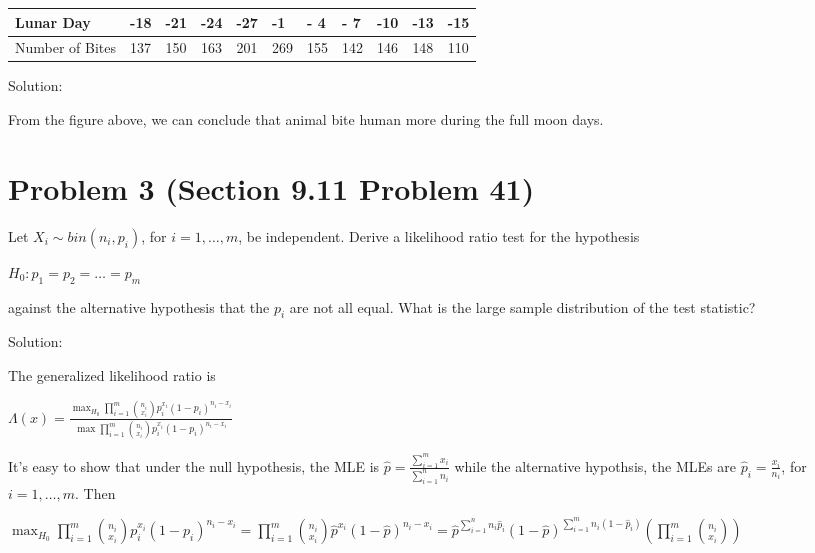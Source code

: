 \documentclass[letterpaper,10pt,english]{sphinxmanual}
\begin{document}
\noindent\begin{tabulary}{\linewidth}{|L|L|L|L|L|L|L|L|L|L|L|}
\hline
\textsf{\relax 
Lunar Day
\unskip}\relax &\textsf{-18
\unskip}\relax &\textsf{-21
\unskip}\relax &\textsf{-24
\unskip}\relax &\textsf{-27
\unskip}\relax &\textsf{-1
\unskip}\relax &\textsf{- 4
\unskip}\relax &\textsf{- 7
\unskip}\relax &\textsf{-10
\unskip}\relax &\textsf{-13
\unskip}\relax &\textsf{-15
\unskip}\relax \\
\hline
Number of Bites
&
137
&
150
&
163
&
201
&
269
&
155
&
142
&
146
&
148
&
110
\\
\hline\end{tabulary}


Solution:

\noindent{}

From the figure above, we can conclude that animal bite human more during the
full moon days.


\chapter{Problem 3 (Section 9.11 Problem 41)}
\label{P3:problem3}\label{P3:problem-3-section-9-11-problem-41}\label{P3::doc}
Let \(X_i \sim bin(n_i, p_i)\), for \(i=1,\dots,m\), be independent. Derive a likelihood ratio test for the hypothesis

\(H_0: p_1 = p_2 = \dots = p_m\)

against the alternative hypothesis that the \(p_i\) are not all equal. What is the large sample distribution of the test statistic?

Solution:

The generalized likelihood ratio is

\(\Lambda(x) = \frac{\max_{H_0} \prod_{i=1}^m {n_i \choose x_i} p_i^{x_i}(1 - p_i)^{n_i - x_i}}{\max \prod_{i=1}^m {n_i \choose x_i} p_i^{x_i}(1 - p_i)^{n_i - x_i}}\)

It's easy to show that under the null hypothesis, the MLE is \(\hat{p} = \frac{\sum_{i=1}^m x_i}{\sum_{i=1}^n n_i}\) while the alternative hypothsis, the MLEs are \(\hat{p}_i = \frac{x_i}{n_i}\), for \(i = 1, \dots, m\). Then

\(\max_{H_0} \prod_{i=1}^m {n_i \choose x_i} p_i^{x_i}(1 - p_i)^{n_i - x_i} = \prod_{i=1}^m {n_i \choose x_i} \hat{p}^{x_i} (1 - \hat{p})^{n_i - x_i} =  \hat{p}^{\sum_{i=1}^n n_i \hat{p}_i} (1 - \hat{p})^{\sum_{i=1}^m n_i(1 - \hat{p}_i)} \left(\prod_{i=1}^m {n_i \choose x_i}\right)\)
\end{document}
